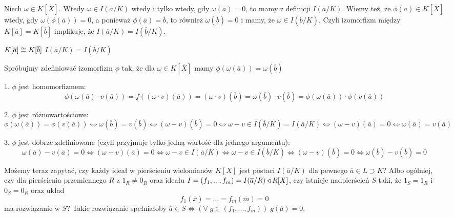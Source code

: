 Niech $\omega\in K[\overline X]$. Wtedy $\omega\in I(\overline a/K)$ wtedy i tylko wtedy, gdy $\omega(\overline a)=0$, to mamy z definicji $I(\overline a/K)$. Wiemy też, że $\phi(a)\in K[\overline X]$ wtedy, gdy $\omega(\phi(\overline a))=0$, a ponieważ $\phi(\overline a)=\overline b$, to również $\omega(\overline b)=0$ i mamy, że $\omega\in I(\overline b/K)$. Czyli izomorfizm między $K[\overline a]=K[\overline b]$ implikuje, że $I(\overline a/K)=I(\overline b/K)$.
\smallskip

$K[\overline a]\cong K[\overline b]$ \acc{$\impliedby$} $I(\overline a/K)=I(\overline b/K)$

Spróbujmy zdefiniować izomorfizm $\phi$ tak, że dla $\omega\in K[\overline X]$ mamy $\phi(\omega(\overline a))=\omega(\overline b)$

1. $\phi$ jest homomorfizmem: 
$$\phi(\omega(\overline a)\cdot v(\overline a))=f((\omega\cdot v)(\overline a))=(\omega\cdot v)(\overline b)=\omega(\overline b)\cdot v(\overline b)=\phi(\omega(\overline a))\cdot \phi(v(\overline a))$$

2. $\phi$ jest różnowartościowe:
$$\phi(\omega(\overline a))=\phi(v(\overline a))\iff \omega(\overline b)=v(\overline b)\iff (\omega-v)(\overline b)=0\iff \omega-v\in I(\overline b/K)=I(\overline a/K)\iff (\omega-v)(\overline a)=0\iff \omega(\overline a)=v(\overline a)$$

3. $\phi$ jest dobrze zdefiniowane (czyli przyjmuje tylko jedną wartość dla jednego argumentu):
$$\omega(\overline a)-v(\overline a)=0\iff (\omega-v)(\overline a)=0\iff \omega -v\in I(\overline a/K)\iff \omega-v\in I(\overline b/K)\iff (\omega-v)(\overline b)=0\iff \omega(\overline b)-v(\overline b)=0$$

\bigskip

Możemy teraz zapytać, czy każdy ideał w pierścieniu wielomianów $K[X]$ jest postaci $I(\overline a/K)$ dla pewnego $\overline a\in L\supset K$? Albo ogólniej, czy dla pierścienia przemiennego $R$ z $1_R\neq0_R$ oraz ideału $I=(f_1,...,f_m)=I(\overline a/R)\triangleleft R[X]$, czy istnieje nadpierścień $S$ taki, że $1_S=1_R$ i $0_S=0_R$ oraz układ
$$f_1(\overline x)=...=f_m(\overline m)=0$$
ma rozwiązanie w $S$? Takie rozwiązanie spełniałoby $\overline a\in S\iff (\forall\;g\in(f_1,...,f_m))\;g(\overline a)=0$.

